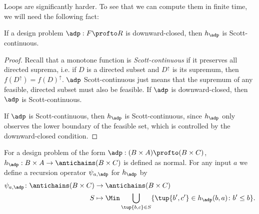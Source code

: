 Loops are significantly harder. To see that we can compute them in finite time, we will need the following fact:
\begin{lemma}
If a design problem $\adp : F \profto R$ is downward-closed, then $h_\adp$ is Scott-continuous.
\end{lemma}

\begin{proof}
Recall that a monotone function is \emph{Scott-continuous} if it preserves all directed suprema, i.e. if $D$ is a directed subset and $D^\uparrow$ is its supremum, then $f(D^\uparrow) = f(D)^\uparrow$. $\adp$ Scott-continuous just means that the supremum of any feasible, directed subset must also be feasible. If $\adp$ is downward-closed, then $\adp$ is Scott-continuous.

 

 If $\adp$ is Scott-continuous, then $h_\adp$ is Scott-continuous, since $h_\adp$ only observes the lower boundary of the feasible set, which is controlled by the downward-closed condition.
\end{proof}

For a design problem of the form $\adp : (B \times A) \profto (B \times C)$, $h_\adp : B \times A \to \antichains (B \times C)$ is defined as normal. For any input $a$ we define a recursion operator $\psi_{a,\adp}$ for $h_\adp$ by
\begin{equation}
\begin{aligned}
\psi_{a,\adp} \colon \antichains (B \times C) &\to \antichains (B \times C) \\
S &\mapsto \Min \bigcup_{\tup{b,c} \in S} \{ \tup{b',c'} \in h_\adp(b,a) \colon b' \leq b \}.
\end{aligned}
\end{equation}

